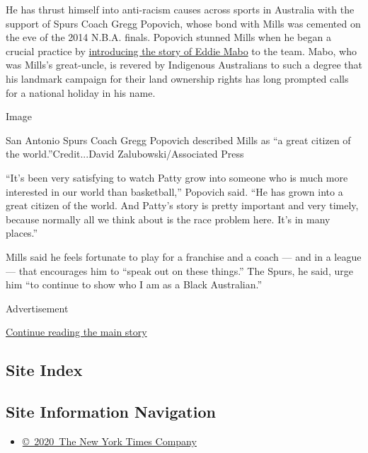 He has thrust himself into anti-racism causes across sports in Australia
with the support of Spurs Coach Gregg Popovich, whose bond with Mills
was cemented on the eve of the 2014 N.B.A. finals. Popovich stunned
Mills when he began a crucial practice by
\href{https://www.si.com/nba/2015/03/24/patty-mills-australia-san-antonio-spurs-bala-gregg-popovich}{introducing
the story of Eddie Mabo} to the team. Mabo, who was Mills's great-uncle,
is revered by Indigenous Australians to such a degree that his landmark
campaign for their land ownership rights has long prompted calls for a
national holiday in his name.

Image

San Antonio Spurs Coach Gregg Popovich described Mills as ``a great
citizen of the world.''Credit...David Zalubowski/Associated Press

``It's been very satisfying to watch Patty grow into someone who is much
more interested in our world than basketball,'' Popovich said. ``He has
grown into a great citizen of the world. And Patty's story is pretty
important and very timely, because normally all we think about is the
race problem here. It's in many places.''

Mills said he feels fortunate to play for a franchise and a coach ---
and in a league --- that encourages him to ``speak out on these
things.'' The Spurs, he said, urge him ``to continue to show who I am as
a Black Australian.''

Advertisement

\protect\hyperlink{after-bottom}{Continue reading the main story}

\hypertarget{site-index}{%
\subsection{Site Index}\label{site-index}}

\hypertarget{site-information-navigation}{%
\subsection{Site Information
Navigation}\label{site-information-navigation}}

\begin{itemize}
\tightlist
\item
  \href{https://help.nytimes.com/hc/en-us/articles/115014792127-Copyright-notice}{©~2020~The
  New York Times Company}
\end{itemize}


